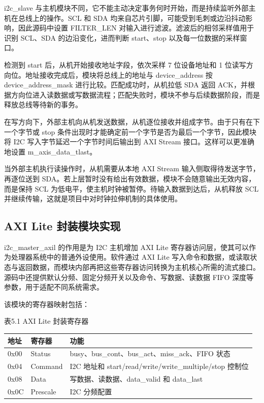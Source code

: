 \documentclass[12pt,a4paper]{article}
\numberwithin{equation}{section}
\begin{document}
i2c\_slave
与主机模块不同，它不能主动决定事务何时开始，而是持续监听外部主机在总线上的操作。SCL
和 SDA 均来自芯片引脚，可能受到毛刺或边沿抖动影响，因此源码中设置
FILTER\_LEN
对输入进行滤波。滤波后的相邻采样值用于识别 SCL、SDA 的边沿变化，进而判断
start、stop 以及每一位数据的采样窗口。

检测到 start 后，从机开始接收地址字段，依次采样 7 位设备地址和 1
位读写方向位。地址接收完成后，模块将总线上的地址与
device\_address 按
device\_address\_mask
进行比较。匹配成功时，从机拉低 SDA 返回
ACK，并根据方向位进入读数据或写数据流程；匹配失败时，模块不参与后续数据阶段，而是释放总线等待新的事务。

在写方向下，外部主机向从机发送数据，从机逐位接收并组成字节。由于只有在下一个字节或
stop 条件出现时才能确定前一个字节是否为最后一个字节，因此模块将 I2C
写入字节延迟一个字节时间后输出到 AXI Stream 接口。这样可以更准确地设置
m\_axis\_data\_tlast。

当外部主机执行读操作时，从机需要从本地 AXI Stream
输入侧取得待发送字节，再逐位送到
SDA。若上层暂时没有给出有效数据，模块不会随意输出无效内容，而是保持 SCL
为低电平，使主机时钟被暂停。待输入数据到达后，从机释放 SCL
并继续传输，这就是项目中对时钟拉伸机制的具体使用。

\subsection{AXI Lite
封装模块实现}\label{axi-lite-ux5c01ux88c5ux6a21ux5757ux5b9eux73b0}

i2c\_master\_axil 的作用是为 I2C 主机增加 AXI
Lite 寄存器访问层，使其可以作为处理器系统中的普通外设使用。软件通过 AXI
Lite
写入命令和数据，或读取状态与返回数据，而模块内部再把这些寄存器访问转换为主机核心所需的流式接口。源码中还提供默认分频、固定分频开关以及命令、写数据、读数据
FIFO 深度等参数，用于适配不同系统需求。

该模块的寄存器映射包括：

表5.1 AXI Lite 封装寄存器

\begin{longtable}[]{@{}
  >{\raggedright\arraybackslash}p{}
  >{\raggedright\arraybackslash}p{}
  >{\raggedright\arraybackslash}p{}@{}}
\toprule\noalign{}
\begin{minipage}[b]{\linewidth}\raggedright
地址
\end{minipage} & \begin{minipage}[b]{\linewidth}\raggedright
寄存器
\end{minipage} & \begin{minipage}[b]{\linewidth}\raggedright
功能
\end{minipage} \\
\midrule\noalign{}
\endhead
\bottomrule\noalign{}
\endlastfoot
0x00 & Status & busy、bus\_cont、bus\_act、miss\_ack、FIFO 状态 \\
0x04 & Command & I2C 地址和 start/read/write/write\_multiple/stop
控制位 \\
0x08 & Data & 写数据、读数据、data\_valid 和 data\_last \\
0x0C & Prescale & I2C 分频配置 \\
\end{longtable}
\end{document}
